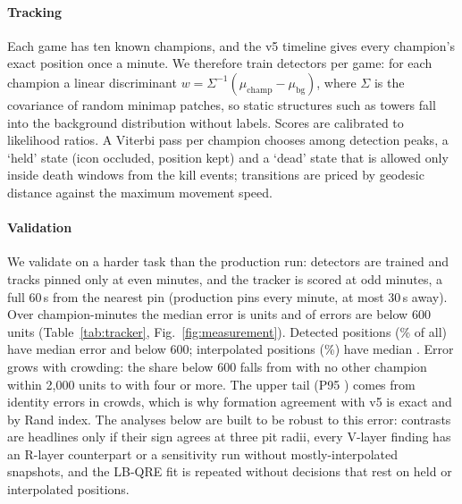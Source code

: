 \paragraph*{Tracking}
Each game has ten known champions, and the v5 timeline gives every champion's exact position once a minute.
We therefore train detectors per game: for each champion a linear discriminant $w=\Sigma^{-1}(\mu_{\mathrm{champ}}-\mu_{\mathrm{bg}})$, where $\Sigma$ is the covariance of random minimap patches, so static structures such as towers fall into the background distribution without labels.
Scores are calibrated to likelihood ratios.
A Viterbi pass per champion chooses among detection peaks, a `held' state (icon occluded, position kept) and a `dead' state that is allowed only inside death windows from the kill events; transitions are priced by geodesic distance against the maximum movement speed.


\paragraph*{Validation}
We validate on a harder task than the production run: detectors are trained and tracks pinned only at even minutes, and the tracker is scored at odd minutes, a full 60\,s from the nearest pin (production pins every minute, at most 30\,s away).
Over  champion-minutes the median error is  units and  of errors are below 600 units (Table~\ref{tab:tracker}, Fig.~\ref{fig:measurement}).
Detected positions (\% of all) have median error  and  below 600; interpolated positions (\%) have median .
Error grows with crowding: the share below 600 falls from  with no other champion within 2,000 units to  with four or more.
The upper tail (P95 ) comes from identity errors in crowds, which is why formation agreement with v5 is  exact and  by Rand index.
The analyses below are built to be robust to this error: contrasts are headlines only if their sign agrees at three pit radii, every V-layer finding has an R-layer counterpart or a sensitivity run without mostly-interpolated snapshots, and the LB-QRE fit is repeated without decisions that rest on held or interpolated positions.

